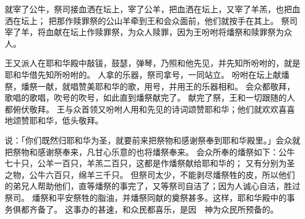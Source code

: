{就宰了公牛，祭司接血洒在坛上，宰了公羊，把血洒在坛上，又宰了羊羔，也把血洒在坛上；
把那作赎罪祭的公山羊牵到王和会众面前，他们就按手在其上。
祭司宰了羊，将血献在坛上作赎罪祭，为{}众人赎罪，因为王吩咐将燔祭和赎罪祭为{}众人{}。
\par }{\PP {}王又派{}人在耶和华殿中敲钹，鼓瑟，弹琴，乃照{}和他先见{}，并先知{}所吩咐的，就是耶和华借先知所吩咐的。
人拿{}的乐器，祭司拿号，一同站立。
吩咐在坛上献燔祭，燔祭一献，就唱赞美耶和华的歌，用号，并用{}王{}的乐器相和。
会众都敬拜，歌唱的歌唱，吹号的吹号，如此直到燔祭献完了。
献完了祭，王和一切跟随的人都俯伏敬拜。
王与众首领又吩咐{}人用{}和先见{}的诗词颂赞耶和华；他们就欢欢喜喜地颂赞耶和华，低头敬拜。
\par }{\PP {}说：「你们既然归耶和华为圣，就要前来把祭物和感谢祭奉到耶和华殿里。」会众就把祭物和感谢祭奉来，凡甘心乐意的也将燔祭奉来。
会众所奉的燔祭如下：公牛七十只，公羊一百只，羊羔二百只，这都是作燔祭献给耶和华的；
又有分别为圣之物，公牛六百只，绵羊三千只。
但祭司太少，不能剥尽燔祭牲的皮，所以他们的弟兄{}人帮助他们，直等燔祭的事完了，又等{}祭司自洁了；因为{}人诚心自洁，胜过祭司。
燔祭和平安祭牲的脂油，并燔祭同献的奠祭甚多。这样，耶和华殿中的事务俱都齐备了。
这事办的甚速，{}和众民都喜乐，是因　神为众民所预备的。

}
